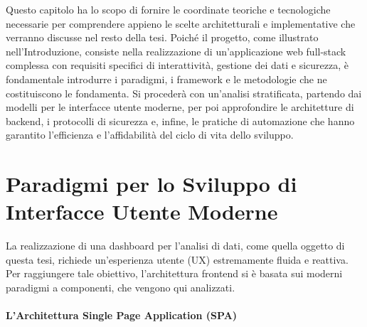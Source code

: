 \documentclass[12pt,a4paper,openright,twoside]{book}
\begin{document}
Questo capitolo ha lo scopo di fornire le coordinate teoriche e tecnologiche necessarie per comprendere appieno le scelte architetturali e implementative che verranno discusse nel resto della tesi. Poiché il progetto, come illustrato nell'Introduzione, consiste nella realizzazione di un'applicazione web full-stack complessa con requisiti specifici di interattività, gestione dei dati e sicurezza, è fondamentale introdurre i paradigmi, i framework e le metodologie che ne costituiscono le fondamenta. Si procederà con un'analisi stratificata, partendo dai modelli per le interfacce utente moderne, per poi approfondire le architetture di backend, i protocolli di sicurezza e, infine, le pratiche di automazione che hanno garantito l'efficienza e l'affidabilità del ciclo di vita dello sviluppo.

\section{Paradigmi per lo Sviluppo di Interfacce Utente Moderne}

La realizzazione di una dashboard per l'analisi di dati, come quella oggetto di questa tesi, richiede un'esperienza utente (UX) estremamente fluida e reattiva. Per raggiungere tale obiettivo, l'architettura frontend si è basata sui moderni paradigmi a componenti, che vengono qui analizzati.

\paragraph{L'Architettura Single Page Application (SPA)}
\end{document}
